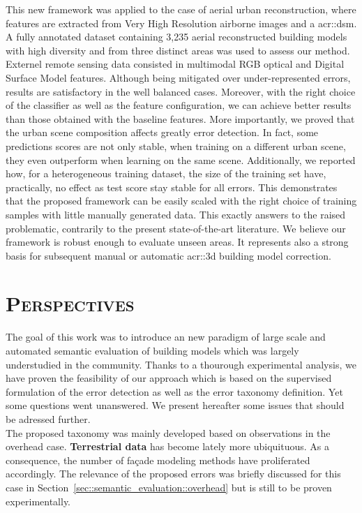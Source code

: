     This new framework was applied to the case of aerial urban reconstruction, where features are extracted from Very High Resolution airborne images and a \acrlong{acr::dsm}.
    A fully annotated dataset containing 3,235 aerial reconstructed building models with high diversity and from three distinct areas was used to assess our method.
    Externel remote sensing data consisted in multimodal RGB optical and Digital Surface Model features.
    Although being mitigated over under-represented errors, results are satisfactory in the well balanced cases.
    Moreover, with the right choice of the classifier as well as the feature configuration, we can achieve better results than those obtained with the baseline features.
    More importantly, we proved that the urban scene composition affects greatly error detection.
    In fact, some predictions scores are not only stable, when training on a different urban scene, they even outperform when learning on the same scene.
    Additionally, we reported how, for a heterogeneous training dataset, the size of the training set have, practically, no effect as test score stay stable for all errors.
    This demonstrates that the proposed framework can be easily scaled with the right choice of training samples with little manually generated data.
    This exactly answers to the raised problematic, contrarily to the present state-of-the-art literature.
    We believe our framework is robust enough to evaluate unseen areas.
    It represents also a strong basis for subsequent manual or automatic \gls{acr::3d} building model correction.

\section{\textsc{Perspectives}}
    \label{sec::conclusion::perspectives}
    The goal of this work was to introduce an new paradigm of large scale and automated semantic evaluation of building models which was largely understudied in the community.
    Thanks to a thourough experimental analysis, we have proven the feasibility of our approach which is based on the supervised formulation of the error detection as well as the error taxonomy definition.
    Yet some questions went unanswered.
    We present hereafter some issues that should be adressed further.\\

    The proposed taxonomy was mainly developed based on observations in the overhead case.
    \textbf{Terrestrial data} has become lately more ubiquituous.
    As a consequence, the number of façade modeling methods have proliferated accordingly.
    The relevance of the proposed errors was briefly discussed for this case in Section~\ref{sec::semantic_evaluation::overhead} but is still to be proven experimentally.\\


